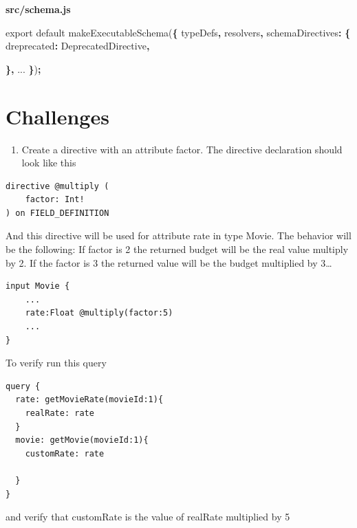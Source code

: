 \documentclass[]{book}
\newenvironment{Shaded}{\begin{snugshade}}{\end{snugshade}}
\newcommand{\DataTypeTok}[1]{\textcolor[rgb]{0.13,0.29,0.53}{#1}}
\newcommand{\ImportTok}[1]{#1}
\newcommand{\OperatorTok}[1]{\textcolor[rgb]{0.81,0.36,0.00}{\textbf{#1}}}
\newcommand{\AttributeTok}[1]{\textcolor[rgb]{0.77,0.63,0.00}{#1}}
\newcommand{\NormalTok}[1]{#1}
\providecommand{\tightlist}{%
  \setlength{\itemsep}{0pt}\setlength{\parskip}{0pt}}
\begin{document}
\textbf{src/schema.js}

\begin{Shaded}
\begin{Highlighting}[]
\ImportTok{export} \ImportTok{default} \AttributeTok{makeExecutableSchema}\NormalTok{(}\OperatorTok{\{}
\NormalTok{    typeDefs}\OperatorTok{,}
\NormalTok{    resolvers}\OperatorTok{,}
    \DataTypeTok{schemaDirectives}\OperatorTok{:} \OperatorTok{\{}
        \DataTypeTok{dreprecated}\OperatorTok{:}\NormalTok{ DeprecatedDirective}\OperatorTok{,}
        
    \OperatorTok{\},}
\NormalTok{    ...}
\OperatorTok{\}}\NormalTok{)}\OperatorTok{;}
\end{Highlighting}
\end{Shaded}

\section{Challenges}\label{challenges-4}

\begin{enumerate}
\def\labelenumi{\arabic{enumi}.}
\tightlist
\item
  Create a directive \citet{multiply} with an attribute factor. The
  directive declaration should look like this
\end{enumerate}

\begin{verbatim}
directive @multiply (
    factor: Int!
) on FIELD_DEFINITION
\end{verbatim}

And this directive will be used for attribute rate in type Movie. The
behavior will be the following: If factor is 2 the returned budget will
be the real value multiply by 2. If the factor is 3 the returned value
will be the budget multiplied by 3\ldots{}

\begin{verbatim}
input Movie {
    ...
    rate:Float @multiply(factor:5)
    ...
}
\end{verbatim}

To verify run this query

\begin{verbatim}
query {
  rate: getMovieRate(movieId:1){
    realRate: rate
  }
  movie: getMovie(movieId:1){
    customRate: rate
    
  }
}
\end{verbatim}

and verify that customRate is the value of realRate multiplied by 5
\end{document}
